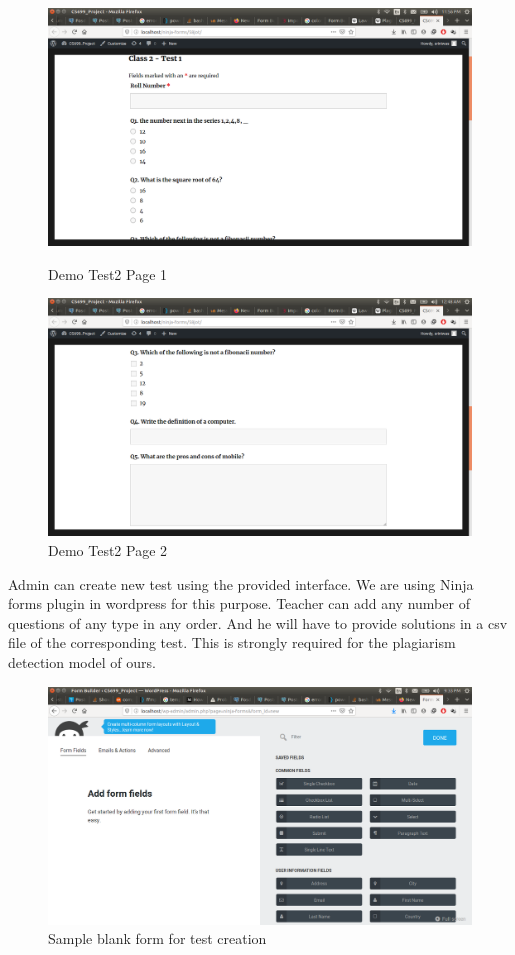 \begin{figure}[H]
\label{fig1}
      \centering
  \begin{minipage}[b]{0.45\textwidth}
    \includegraphics[width=\textwidth]{images/Test2.png}
    \caption{Demo Test2 Page 1}
  \end{minipage}
  \hfill
  \begin{minipage}[b]{0.45\textwidth}
    \includegraphics[width=\textwidth]{images/Test21.png}
    \caption{Demo Test2 Page 2}
  \end{minipage}
  \hfill
\end{figure} 
Admin can create new test using the provided interface. We are using Ninja forms plugin in wordpress for this purpose. Teacher can add any number of questions of any type in any order. And he will have to provide solutions in a csv file of the corresponding test. This is strongly required for the plagiarism detection model of ours. 
\begin{figure}[H]
    \centering
    \includegraphics[width=0.5\paperwidth]{images/test_form.png}
    \caption{Sample blank form for test creation}
    \label{fig:galaxy}
\end{figure}
